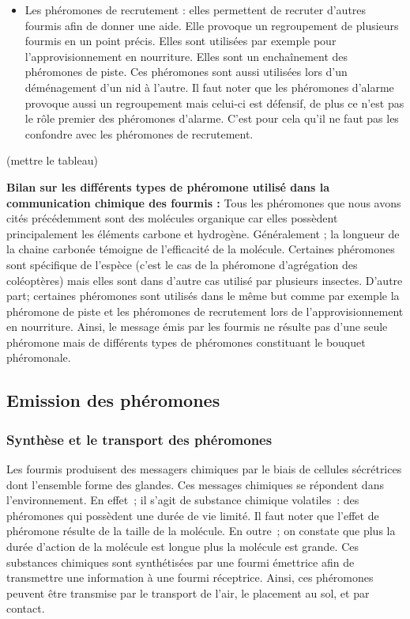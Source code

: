 \begin{itemize}
\itemsep1pt\parskip0pt
\item
  Les phéromones de recrutement : elles permettent de recruter d'autres
  fourmis afin de donner une aide. Elle provoque un regroupement de
  plusieurs fourmis en un point précis. Elles sont utilisées par exemple
  pour l'approvisionnement en nourriture. Elles sont un enchaînement des
  phéromones de piste. Ces phéromones sont aussi utilisées lors d'un
  déménagement d'un nid à l'autre. Il faut noter que les phéromones
  d'alarme provoque aussi un regroupement mais celui-ci est défensif, de
  plus ce n'est pas le rôle premier des phéromones d'alarme. C'est pour
  cela qu'il ne faut pas les confondre avec les phéromones de
  recrutement.
\end{itemize}

(mettre le tableau)

\textbf{Bilan sur les différents types de phéromone utilisé dans la
communication chimique des fourmis :} Tous les phéromones que nous avons
cités précédemment sont des molécules organique car elles possèdent
principalement les éléments carbone et hydrogène. Généralement ; la
longueur de la chaine carbonée témoigne de l'efficacité de la molécule.
Certaines phéromones sont spécifique de l'espèce (c'est le cas de la
phéromone d'agrégation des coléoptères) mais elles sont dans d'autre cas
utilisé par plusieurs insectes. D'autre part; certaines phéromones sont
utilisés dans le même but comme par exemple la phéromone de piste et les
phéromones de recrutement lors de l'approvisionnement en nourriture.
Ainsi, le message émis par les fourmis ne résulte pas d'une seule
phéromone mais de différents types de phéromones constituant le bouquet
phéromonale.

\subsection{Emission des phéromones}

\subsubsection{Synthèse et le transport des phéromones}

Les fourmis produisent des messagers chimiques par le biais de cellules
sécrétrices dont l'ensemble forme des glandes. Ces messages chimiques se
répondent dans l'environnement. En effet~; il s'agit de substance
chimique volatiles~: des phéromones qui possèdent une durée de vie
limité. Il faut noter que l'effet de phéromone résulte de la taille de
la molécule. En outre~; on constate que plus la durée d'action de la
molécule est longue plus la molécule est grande. Ces substances
chimiques sont synthétisées par une fourmi émettrice afin de transmettre
une information à une fourmi réceptrice. Ainsi, ces phéromones peuvent
être transmise par le transport de l'air, le placement au sol, et par
contact.

